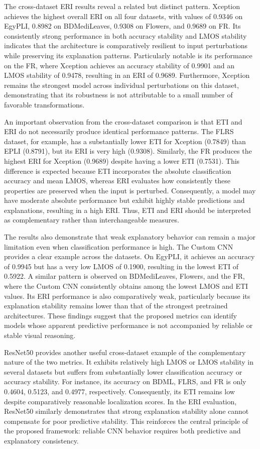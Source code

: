 \documentclass[a4paper,fleqn]{cas-dc}
\begin{document}
The cross-dataset ERI results reveal a related but distinct pattern. Xception achieves the highest overall ERI on all four datasets, with values of 0.9346 on EgyPLI, 0.8982 on BDMediLeaves, 0.9308 on Flowers, and 0.9689 on FR. Its consistently strong performance in both accuracy stability and LMOS stability indicates that the architecture is comparatively resilient to input perturbations while preserving its explanation patterns. Particularly notable is its performance on the FR, where Xception achieves an accuracy stability of 0.9901 and an LMOS stability of 0.9478, resulting in an ERI of 0.9689. Furthermore, Xception remains the strongest model across individual perturbations on this dataset, demonstrating that its robustness is not attributable to a small number of favorable transformations. 

An important observation from the cross-dataset comparison is that ETI and ERI do not necessarily produce identical performance patterns. The FLRS dataset, for example, has a substantially lower ETI for Xception (0.7849) than EPLI (0.8791), but its ERI is very high (0.9308). Similarly, the FR produces the highest ERI for Xception (0.9689) despite having a lower ETI (0.7531). This difference is expected because ETI incorporates the absolute classification accuracy and mean LMOS, whereas ERI evaluates how consistently these properties are preserved when the input is perturbed. Consequently, a model may have moderate absolute performance but exhibit highly stable predictions and explanations, resulting in a high ERI. Thus, ETI and ERI should be interpreted as complementary rather than interchangeable measures.

The results also demonstrate that weak explanatory behavior can remain a major limitation even when classification performance is high. The Custom CNN provides a clear example across the datasets. On EgyPLI, it achieves an accuracy of 0.9945 but has a very low LMOS of 0.1900, resulting in the lowest ETI of 0.5922. A similar pattern is observed on BDMediLeaves, Flowers, and the FR, where the Custom CNN consistently obtains among the lowest LMOS and ETI values. Its ERI performance is also comparatively weak, particularly because its explanation stability remains lower than that of the strongest pretrained architectures. These findings suggest that the proposed metrics can identify models whose apparent predictive performance is not accompanied by reliable or stable visual reasoning.

ResNet50 provides another useful cross-dataset example of the complementary nature of the two metrics. It exhibits relatively high LMOS or LMOS stability in several datasets but suffers from substantially lower classification accuracy or accuracy stability. For instance, its accuracy on BDML, FLRS, and FR is only 0.4604, 0.5123, and 0.4977, respectively. Consequently, its ETI remains low despite comparatively reasonable localization scores. In the ERI evaluation, ResNet50 similarly demonstrates that strong explanation stability alone cannot compensate for poor predictive stability. This reinforces the central principle of the proposed framework: reliable CNN behavior requires both predictive and explanatory consistency.
\end{document}
